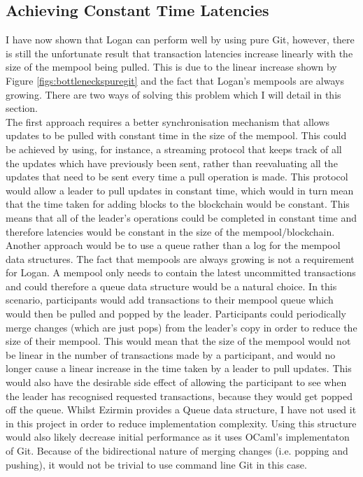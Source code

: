 \documentclass[12pt,a4paper,twoside,openright]{report}
\begin{document}
	\subsection{Achieving Constant Time Latencies}\label{sect:bettersync}
	I have now shown that Logan can perform well by using pure Git, however, there is still the unfortunate result that transaction latencies increase linearly with the size of the mempool being pulled.
	This is due to the linear increase shown by Figure \ref{figs:bottleneckspuregit} and the fact that Logan's mempools are always growing. 
	There are two ways of solving this problem which I will detail in this section.\\

	The first approach requires a better synchronisation mechanism that allows updates to be pulled with constant time in the size of the mempool.
	This could be achieved by using, for instance, a streaming protocol that keeps track of all the updates which have previously been sent, rather than reevaluating all the updates that need to be sent every time a pull operation is made. 
	This protocol would allow a leader to pull updates in constant time, which would in turn mean that the time taken for adding blocks to the blockchain would be constant.
	This means that all of the leader's operations could be completed in constant time and therefore latencies would be constant in the size of the mempool/blockchain. \\

	Another approach would be to use a queue rather than a log for the mempool data structures. 
	The fact that mempools are always growing is not a requirement for Logan.
	A mempool only needs to contain the latest uncommitted transactions and could therefore a queue data structure would be a natural choice.
	In this scenario, participants would add transactions to their mempool queue which would then be pulled and popped by the leader.
	Participants could periodically merge changes (which are just pops) from the leader's copy in order to reduce the size of their mempool.
	This would mean that the size of the mempool would not be linear in the number of transactions made by a participant, and would no longer cause a linear increase in the time taken by a leader to pull updates.
	This would also have the desirable side effect of allowing the participant to see when the leader has recognised requested transactions, because they would get popped off the queue. 
	Whilst Ezirmin provides a Queue data structure, I have not used it in this project in order to reduce implementation complexity.
	Using this structure would also likely decrease initial performance as it uses OCaml's implementaton of Git.
	Because of the bidirectional nature of merging changes (i.e. popping and pushing), it would not be trivial to use command line Git in this case. \\
\end{document}
